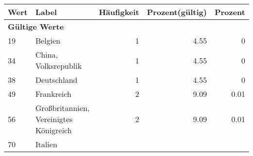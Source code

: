      \begin{longtable}{lXrrr}
     \toprule
     \textbf{Wert} & \textbf{Label} & \textbf{Häufigkeit} & \textbf{Prozent(gültig)} & \textbf{Prozent} \\
     \endhead
     \midrule
     \multicolumn{5}{l}{\textbf{Gültige Werte}}\\

     19 &
     \multicolumn{1}{X}{ Belgien   } &


       \num{1} &
       \num[round-mode=places,round-precision=2]{4.55} &
         \num[round-mode=places,round-precision=2]{0} \\

     34 &
     \multicolumn{1}{X}{ China, Volksrepublik   } &


       \num{1} &
       \num[round-mode=places,round-precision=2]{4.55} &
         \num[round-mode=places,round-precision=2]{0} \\

     38 &
     \multicolumn{1}{X}{ Deutschland   } &


       \num{1} &
       \num[round-mode=places,round-precision=2]{4.55} &
         \num[round-mode=places,round-precision=2]{0} \\

     49 &
     \multicolumn{1}{X}{ Frankreich   } &


       \num{2} &
       \num[round-mode=places,round-precision=2]{9.09} &
         \num[round-mode=places,round-precision=2]{0.01} \\

     56 &
     \multicolumn{1}{X}{ Großbritannien, Vereinigtes Königreich   } &


       \num{2} &
       \num[round-mode=places,round-precision=2]{9.09} &
         \num[round-mode=places,round-precision=2]{0.01} \\

     70 &
     \multicolumn{1}{X}{ Italien   } &



\end{longtable}

